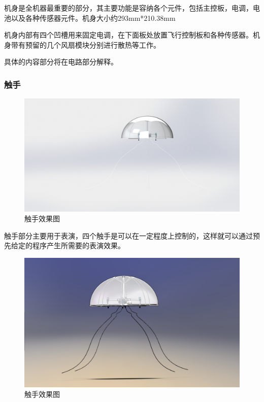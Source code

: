 \documentclass{ctexart}
\begin{document}
机身是全机器最重要的部分，其主要功能是容纳各个元件，包括主控板，电调，电池以及各种传感器元件。机身大小约293mm*210.38mm\par
机身内部有四个凹槽用来固定电调，在下面板处放置飞行控制板和各种传感器。机身带有预留的几个风扇模块分别进行散热等工作。\par
具体的内容部分将在电路部分解释。
\subsubsection{触手}
\begin{figure}[H]
\centering
    \includegraphics[width = \textwidth]{016}
    \caption{触手效果图}\par
\end{figure}
触手部分主要用于表演，四个触手是可以在一定程度上控制的，这样就可以通过预先给定的程序产生所需要的表演效果。
\begin{figure}[H]
\centering
    \includegraphics[width = \textwidth]{017}
    \caption{触手效果图}\par
\end{figure}
\end{document}
